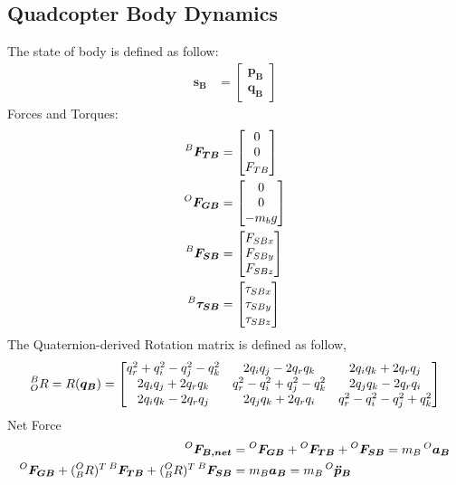 \subsection{Quadcopter Body Dynamics}
The state of body is defined as follow:
\begin{align*}
  \bm{s_B} &=
  \begin{bmatrix}
    \bm{p_B} \\ \bm{q_B}
  \end{bmatrix}
\end{align*}
Forces and Torques:
\begin{align*}
  \prescript{B}{}{\bm{F_{TB}}} &=
  \begin{bmatrix}
    0 \\ 0 \\ F_{TB}
  \end{bmatrix} \\
  \prescript{O}{}{\bm{F_{GB}}} &=
  \begin{bmatrix}
    0 \\ 0 \\ -m_b g
  \end{bmatrix} \\
  \prescript{B}{}{\bm{F_{SB}}} &=
  \begin{bmatrix}
    F_{SBx} \\ F_{SBy} \\ F_{SBz} 
  \end{bmatrix} \\
  \prescript{B}{}{\bm{\tau_{SB}}} &=
  \begin{bmatrix}
    \tau_{SBx} \\ \tau_{SBy} \\ \tau_{SBz} 
  \end{bmatrix}
\end{align*}
The Quaternion-derived Rotation matrix is defined as follow,
\begin{align*}
  \prescript{B}{O}{R} = R(\bm{q_B}) =
  \begin{bmatrix}
    q_r^2 + q_i^2 - q_j^2 - q_k^2 & 2q_iq_j - 2q_rq_k & 2q_iq_k + 2q_rq_j \\
    2q_iq_j + 2q_rq_k & q_r^2 - q_i^2 + q_j^2 - q_k^2 & 2q_jq_k - 2q_rq_i \\
    2q_iq_k - 2q_rq_j & 2q_jq_k + 2q_rq_i & q_r^2 - q_i^2 - q_j^2 +q_k^2
  \end{bmatrix}
\end{align*}
Net Force
\begin{align*}
  \prescript{O}{}{\bm{F_{B, net}}} &= \prescript{O}{}{\bm{F_{GB}}} + \prescript{O}{}{\bm{F_{TB}}} + \prescript{O}{}{\bm{F_{SB}}} = m_B \prescript{O}{}{\bm{a_B}} \\
  \prescript{O}{}{\bm{F_{GB}}} + (\prescript{O}{B}{R})^T \prescript{B}{}{\bm{F_{TB}}} + (\prescript{O}{B}{R})^T \prescript{B}{}{\bm{F_{SB}}} &= m_B \bm{a_B} = m_B \prescript{O}{}{\bm{\ddot{p}_B}}
\end{align*}
